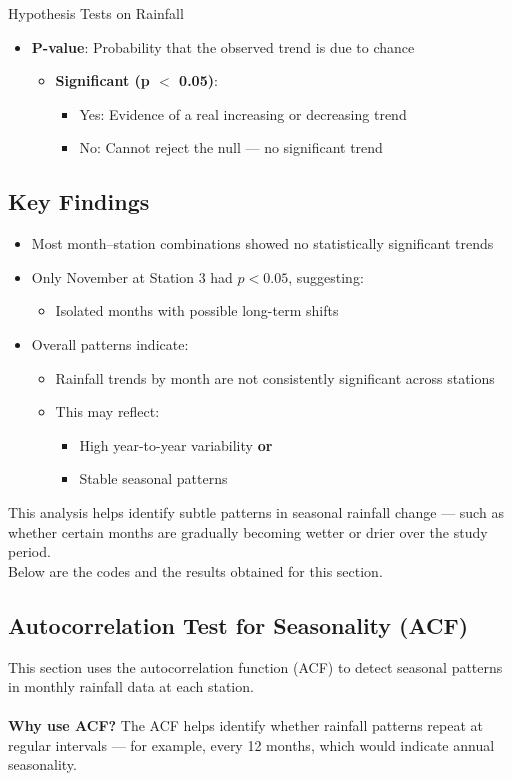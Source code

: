 \documentclass[12pt]{article}
\theoremstyle{definition}
\begin{document}
\begin{section}{Hypothesis Tests on Rainfall}
\begin{itemize}
    \item \textbf{P-value}: Probability that the observed trend is due to chance
    \begin{itemize}
        \item \textbf{Significant (p $<$ 0.05)}:
        \begin{itemize}
            \item Yes: Evidence of a real increasing or decreasing trend
            \item No: Cannot reject the null — no significant trend
        \end{itemize}
    \end{itemize}
\end{itemize}
\subsection*{Key Findings}
\begin{itemize}
    \item Most month--station combinations showed no statistically significant trends
    \item Only November at Station 3 had $p < 0.05$, suggesting:
    \begin{itemize}
        \item Isolated months with possible long-term shifts
    \end{itemize}
    \item Overall patterns indicate:
    \begin{itemize}
        \item Rainfall trends by month are not consistently significant across stations
        \item This may reflect:
        \begin{itemize}
            \item High year-to-year variability \textbf{or}
            \item Stable seasonal patterns
        \end{itemize}
    \end{itemize}
\end{itemize}
This analysis helps identify subtle patterns in seasonal rainfall change — such as whether certain months are gradually becoming wetter or drier over the study period.\\

Below are the codes and the results obtained for this section.


\subsection{Autocorrelation Test for Seasonality (ACF)}
This section uses the autocorrelation function (ACF) to detect seasonal patterns in monthly rainfall data at each station.\\ \\
\textbf{Why use ACF? }The ACF helps identify whether rainfall patterns repeat at regular intervals — for example, every 12 months, which would indicate annual seasonality.


\end{section}
\end{document}
